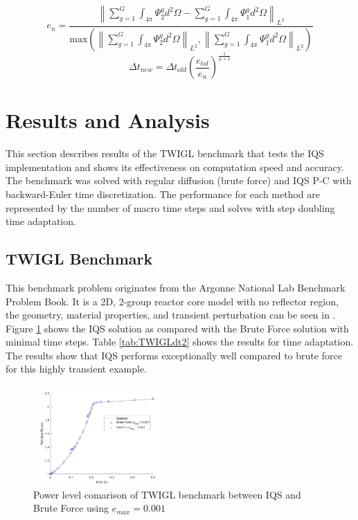 \documentclass{anstrans}
\newcommand{\be}{\begin{equation}}
\newcommand{\ee}{\end{equation}}
\newcommand{\norm}[1]{\left\lVert#1\right\rVert_{L^2}}
\begin{document}
\be
e_n = \frac{\norm{\sum_{g=1}^G\int_{4\pi}\Psi^g_2 d^2\Omega - \sum_{g=1}^G\int_{4\pi}\Psi^g_1 d^2\Omega}}{\text{max}\left(\norm{\sum_{g=1}^G\int_{4\pi}\Psi^g_2 d^2\Omega},\norm{\sum_{g=1}^G \int_{4\pi}\Psi^g_1 d^2\Omega}\right)}
\label{eq:edt2}
\ee
\be
\Delta t_{new} = \Delta t_{old} \left(\frac{e_{tol}}{e_n}\right)^{\frac{1}{\mu+1}}
\label{eq:dt2}
\ee 

\section{Results and Analysis}
This section describes results of the TWIGL benchmark that tests the IQS implementation and shows its effectiveness on computation speed and accuracy.  The benchmark was solved with regular diffusion (brute force) and IQS P-C with backward-Euler time discretization.  The performance for each method are represented by the number of macro time steps and solves with step doubling time adaptation.

\subsection{TWIGL Benchmark}

This benchmark problem originates from the Argonne National Lab Benchmark Problem Book.  It is a 2D, 2-group reactor core model with no reflector region, the geometry, material properties, and transient perturbation can be seen in \cite{BPB}.  Figure \ref{fig:TWIGL_power} shows the IQS  solution as compared with the Brute Force solution with minimal time steps.  Table \ref{tab:TWIGLdt2} shows the results for time adaptation.  The results show that IQS performs exceptionally well compared to brute force for this highly transient example.

\begin{figure}[!htbp]
\centering
\includegraphics[width=0.45\textwidth]{TWIGL_power_plot.png}
\caption{Power level comarison of TWIGL benchmark between IQS and Brute Force using $e_{max} = 0.001$}
\label{fig:TWIGL_power}
\end{figure}
\end{document}
